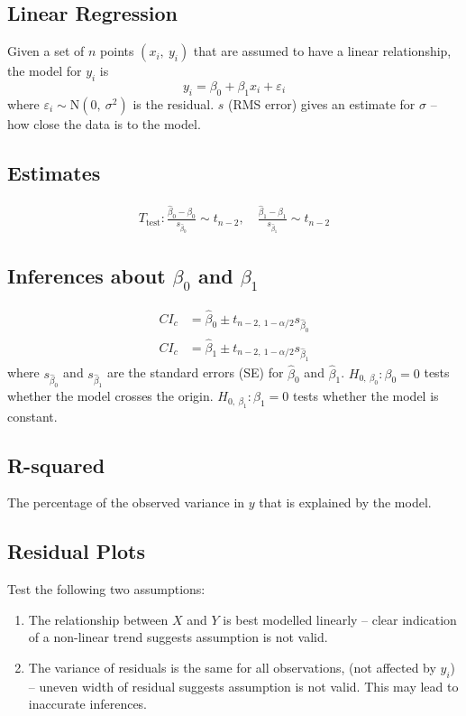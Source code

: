 \documentclass{article}
\begin{document}
\begin{multicols}{3}
    \section*{Linear Regression}
    Given a set of $n$ points $\left( x_i,\: y_i \right)$ that are assumed to have a linear relationship,
    the model for $y_i$ is
    \begin{equation*}
        y_i = \beta_0 + \beta_1 x_i + \varepsilon_i
    \end{equation*}
    where $\varepsilon_i \sim \mathrm{N}\left( 0,\: \sigma^2 \right)$ is the residual.
    $s$ (RMS error) gives an estimate for $\sigma$ --
    how close the data is to the model.
    \subsection*{Estimates}
    \begin{align*}
        T_{\text{test}}:\frac{\hat{\beta}_0 - \beta_0}{s_{\hat{\beta}_0}} \sim t_{n-2},\quad \frac{\hat{\beta}_1 - \beta_1}{s_{\hat{\beta}_1}} \sim t_{n-2}
    \end{align*}
    \subsection*{Inferences about $\beta_0$ and $\beta_1$}
    \begin{align*}
        CI_c & = \hat{\beta}_0 \pm t_{n-2,\: 1-\alpha/2} s_{\hat{\beta}_0} \\
        CI_c & = \hat{\beta}_1 \pm t_{n-2,\: 1-\alpha/2} s_{\hat{\beta}_1}
    \end{align*}
    where $s_{\hat{\beta}_0}$ and $s_{\hat{\beta}_1}$ are the standard errors (SE) for $\hat{\beta}_0$ and $\hat{\beta}_1$.
    $H_{0,\:\beta_0}:\beta_0=0$ tests whether the model crosses the origin.
    $H_{0,\:\beta_1}:\beta_1=0$ tests whether the model is constant.
    \subsection*{R-squared}
    The percentage of the observed variance in $y$ that is explained by the model.
    \subsection*{Residual Plots}
    Test the following two assumptions:
    \begin{enumerate}
        \item The relationship between $X$ and $Y$ is best modelled linearly
              -- clear indication of a non-linear trend suggests assumption is not valid.
        \item The variance of residuals is the same for all observations, (not affected by $y_i$)
              -- uneven width of residual suggests assumption is not valid.
              This may lead to inaccurate inferences.
    \end{enumerate}
\end{multicols}
\end{document}

